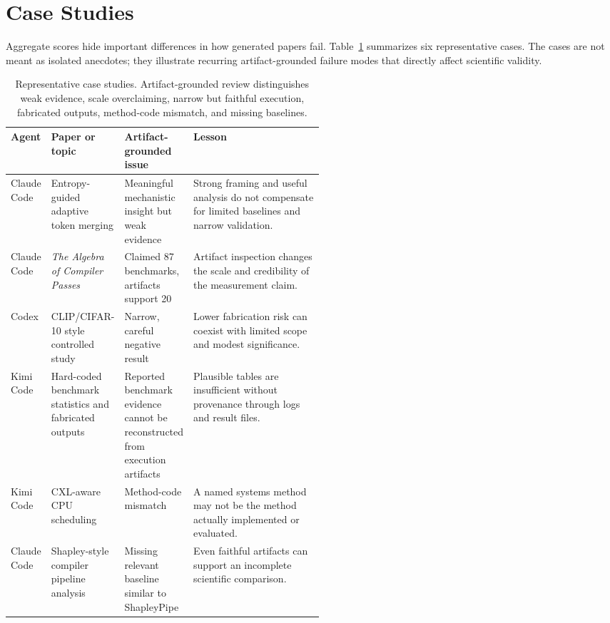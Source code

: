 \section{Case Studies}

Aggregate scores hide important differences in how generated papers fail. Table~\ref{tab:cases} summarizes six representative cases. The cases are not meant as isolated anecdotes; they illustrate recurring artifact-grounded failure modes that directly affect scientific validity.

\begin{table}[t]
\centering
\scriptsize
\begin{tabularx}{\linewidth}{p{0.11\linewidth} p{0.22\linewidth} p{0.18\linewidth} X}
\toprule
Agent & Paper or topic & Artifact-grounded issue & Lesson \\
\midrule
Claude Code & Entropy-guided adaptive token merging & Meaningful mechanistic insight but weak evidence & Strong framing and useful analysis do not compensate for limited baselines and narrow validation. \\
Claude Code & \emph{The Algebra of Compiler Passes} & Claimed 87 benchmarks, artifacts support 20 & Artifact inspection changes the scale and credibility of the measurement claim. \\
Codex & CLIP/CIFAR-10 style controlled study & Narrow, careful negative result & Lower fabrication risk can coexist with limited scope and modest significance. \\
Kimi Code & Hard-coded benchmark statistics and fabricated outputs & Reported benchmark evidence cannot be reconstructed from execution artifacts & Plausible tables are insufficient without provenance through logs and result files. \\
Kimi Code & CXL-aware CPU scheduling & Method-code mismatch & A named systems method may not be the method actually implemented or evaluated. \\
Claude Code & Shapley-style compiler pipeline analysis & Missing relevant baseline similar to ShapleyPipe & Even faithful artifacts can support an incomplete scientific comparison. \\
\bottomrule
\end{tabularx}
\caption{Representative case studies. Artifact-grounded review distinguishes weak evidence, scale overclaiming, narrow but faithful execution, fabricated outputs, method-code mismatch, and missing baselines.}
\label{tab:cases}
\end{table}

